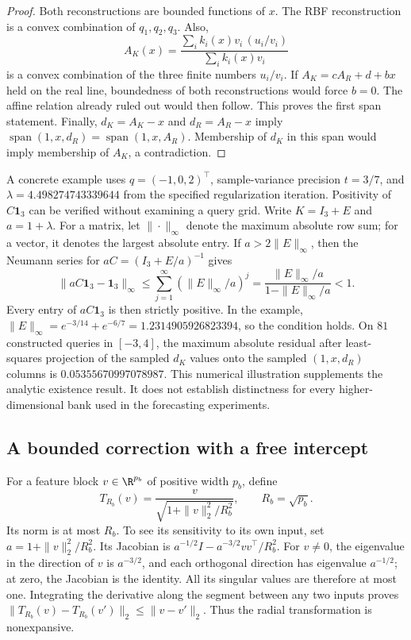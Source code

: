 \begin{proof}
Both reconstructions are bounded functions of $x$. The RBF reconstruction
is a convex combination of $q_1,q_2,q_3$. Also,
\[
 A_K(x)=\frac{\sum_i k_i(x)v_i\,(u_i/v_i)}
 {\sum_i k_i(x)v_i}
\]
is a convex combination of the three finite numbers $u_i/v_i$.
If $A_K=cA_R+d+bx$ held on the real line, boundedness of both
reconstructions would force $b=0$. The affine relation already ruled out
would then follow. This proves the first span statement. Finally,
$d_K=A_K-x$ and $d_R=A_R-x$ imply
$\operatorname{span}(1,x,d_R)=\operatorname{span}(1,x,A_R)$.
Membership of $d_K$ in this span would imply membership of $A_K$, a
contradiction.
\end{proof}

A concrete example uses $q=(-1,0,2)^\top$, sample-variance precision
$t=3/7$, and $\lambda=4.498274743339644$ from the specified
regularization iteration. Positivity of $C\mathbf1_3$ can be verified
without examining a query grid. Write $K=I_3+E$ and $a=1+\lambda$.
For a matrix, let $\|\cdot\|_\infty$ denote the maximum absolute row
sum; for a vector, it denotes the largest absolute entry. If
$a>2\|E\|_\infty$, then the Neumann series for
$aC=(I_3+E/a)^{-1}$ gives
\[
 \|aC\mathbf1_3-\mathbf1_3\|_\infty
 \leq\sum_{j=1}^{\infty}(\|E\|_\infty/a)^j
 =\frac{\|E\|_\infty/a}{1-\|E\|_\infty/a}<1.
\]
Every entry of $aC\mathbf1_3$ is then strictly positive. In the example,
$\|E\|_\infty=e^{-3/14}+e^{-6/7}=1.2314905926823394$, so the
condition holds. On $81$ constructed queries in $[-3,4]$, the maximum
absolute residual after least-squares projection of the sampled $d_K$
values onto the sampled $(1,x,d_R)$ columns is
$0.05355670997078987$. This numerical illustration supplements the
analytic existence result. It does not establish distinctness for every
higher-dimensional bank used in the forecasting experiments.

\subsection{A bounded correction with a free intercept}

For a feature block $v\in\R^{p_b}$ of positive width $p_b$, define
\begin{equation}
 T_{R_b}(v)=\frac{v}{\sqrt{1+\|v\|_2^2/R_b^2}},\qquad
 R_b=\sqrt{p_b}.
 \label{eq:mechanism-radial}
\end{equation}
Its norm is at most $R_b$. To see its sensitivity to its own input, set
$a=1+\|v\|_2^2/R_b^2$. Its Jacobian is
$a^{-1/2}I-a^{-3/2}vv^\top/R_b^2$. For $v\ne0$, the eigenvalue in
the direction of $v$ is $a^{-3/2}$, and each orthogonal direction has
eigenvalue $a^{-1/2}$; at zero, the Jacobian is the identity. All its
singular values are therefore at most one. Integrating the derivative
along the segment between any two inputs proves
$\|T_{R_b}(v)-T_{R_b}(v')\|_2\leq\|v-v'\|_2$.
Thus the radial transformation is nonexpansive.

